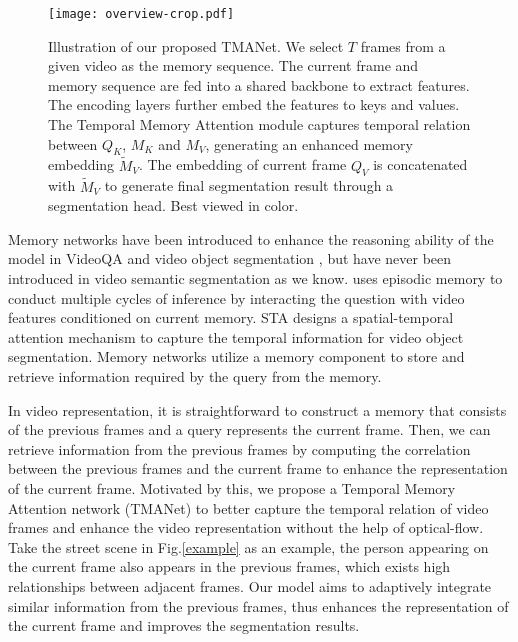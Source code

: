 \documentclass{article}
\begin{document}
	\begin{figure*}[thb!]
		\begin{center}
			\texttt{[image: overview-crop.pdf]}
		\end{center}
		\vspace{-0.5cm}
		\caption{Illustration of our proposed TMANet. We select $T$ frames from a given video as the memory sequence.  The current frame and memory sequence are fed into a shared backbone to extract features. The encoding layers further embed the features to keys and values. The Temporal Memory Attention module captures temporal relation between $Q_K$, $M_K$ and $M_V$,  generating an enhanced memory embedding $\tilde{M}_V$. The embedding of current frame $Q_V$ is concatenated with $\tilde{M}_V$ to generate final segmentation result through a segmentation head. Best viewed in color.}
		\vspace{-0.36cm}
		\label{overview}
	\end{figure*}
	
	Memory networks have been introduced to enhance the reasoning ability of the model in VideoQA \cite{motion2018, heterogeneous2019} and video object segmentation \cite{STA2019, faset_vos2020, enhanced2019}, but have never been introduced in video semantic segmentation as we know. 
	\cite{motion2018}  uses episodic memory to conduct multiple cycles of inference by interacting the question with video features conditioned on current memory. 
	STA \cite{STA2019} designs a spatial-temporal attention mechanism to capture the temporal information for video object segmentation. Memory networks utilize a memory component to store and retrieve information required by the query from the memory. 
	
	In video representation, it is straightforward to construct a memory that consists of the previous frames and a query represents the current frame. 
	Then, we can retrieve information from the previous frames by computing the correlation between the previous frames and the current frame to enhance the representation of the current frame.  
	Motivated by this, we propose a Temporal Memory Attention network (TMANet) to better capture the temporal relation of video frames and enhance the video representation without the help of optical-flow. 
	Take the street scene in Fig.\ref{example} as an example, the person appearing on the current frame also appears in the previous frames, which exists high relationships between adjacent frames. Our model aims to adaptively integrate similar information from the previous frames, thus enhances the representation of the current frame and improves the segmentation results.
	
\end{document}
